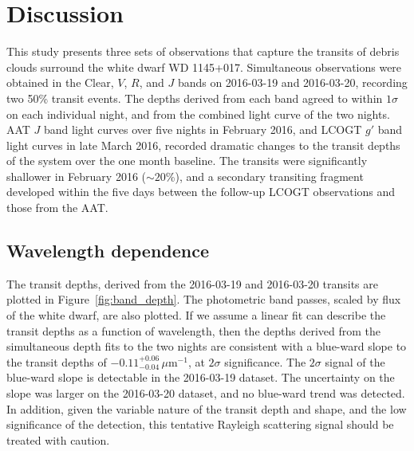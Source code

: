 \documentclass[iop,useAMES,usenatbig]{emulateapj}
\begin{document}
\section{Discussion}
\label{sec:discussion}

This study presents three sets of observations that capture the transits of debris clouds surround the white dwarf WD 1145+017. Simultaneous observations were obtained in the Clear, $V$, $R$, and $J$ bands on 2016-03-19 and 2016-03-20, recording two 50\% transit events. The depths derived from each band agreed to within $1\sigma$ on each individual night, and from the combined light curve of the two nights. AAT $J$ band light curves over five nights in February 2016, and LCOGT $g'$ band light curves in late March 2016, recorded dramatic changes to the transit depths of the system over the one month baseline. The transits were significantly shallower in February 2016 ($\sim 20$\%), and a secondary transiting fragment developed within the five days between the follow-up LCOGT observations and those from the AAT. 

\subsection{Wavelength dependence}

The transit depths, derived from the 2016-03-19 and 2016-03-20 transits are plotted in Figure~\ref{fig:band_depth}. The photometric band passes, scaled by flux of the white dwarf, are also plotted. If we assume a linear fit can describe the transit depths as a function of wavelength, then the depths derived from the simultaneous depth fits to the two nights are consistent with a blue-ward slope to the transit depths of $-0.11_{-0.04}^{+0.06}\,\mu\mathrm{m}^{-1}$, at $2\sigma$ significance. The $2\sigma$ signal of the blue-ward slope is detectable in the 2016-03-19 dataset. The uncertainty on the slope was larger on the 2016-03-20 dataset, and no blue-ward trend was detected. In addition, given the variable nature of the transit depth and shape, and the low significance of the detection, this tentative Rayleigh scattering signal should be treated with caution.
\end{document}
